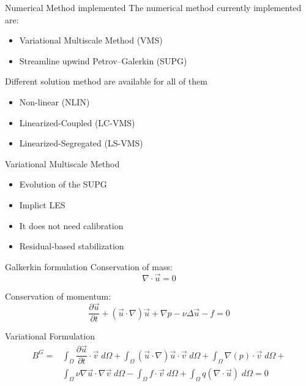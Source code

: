 \begin{frame}{Numerical Method implemented}
The numerical method currently implemented are:
  \begin{itemize}
    \item Variational Multiscale Method (VMS)
    \item Streamline upwind Petrov–Galerkin (SUPG)
  \end{itemize} 

Different solution method are available for all of them 
  \begin{itemize}
    \item Non-linear (NLIN)
    \item Linearized-Coupled (LC-VMS)
    \item Linearized-Segregated (LS-VMS)
  \end{itemize} 
\end{frame}


\begin{frame}{Variational Multiscale Method}
  \begin{itemize}
    \item Evolution of the SUPG
    \item Implict LES
    \item It does not need calibration
    \item Residual-based stabilization
  \end{itemize} 
\end{frame}


\begin{frame}{Galkerkin formulation}
Conservation of mass:
\begin{equation}
    \nabla\cdot \Vec{u} = 0
    \label{equfo:cont}
\end{equation}

Conservation of momentum:
\begin{equation}
    \dfrac{\partial \Vec{u}}{\partial t} + (\Vec{u}\cdot\nabla)\Vec{u} + \nabla p - \nu\Delta\Vec{u} - f = 0
        \label{equfo:mom}
\end{equation}

Variational Formulation
\begin{equation}
\begin{split}
  B^G = &   \int_\Omega \dfrac{\partial \Vec{u}}{\partial t}\cdot \Vec{v}\;d\Omega +
    \int_\Omega(\Vec{u}\cdot\nabla)\Vec{u}\cdot \Vec{v} \;d\Omega+ 
    \int_\Omega \nabla (p)\cdot\Vec{v} \;d\Omega + \\
     & \int_\Omega\nu\nabla\Vec{u}\cdot\nabla\Vec{v} \;d\Omega  -
        \int_\Omega f\cdot\Vec{v} \;d\Omega + 
    \int_\Omega q(\nabla \cdot \Vec{u})\;d\Omega = 0
    \end{split}
    \label{equ:weak}
\end{equation}

\end{frame}

